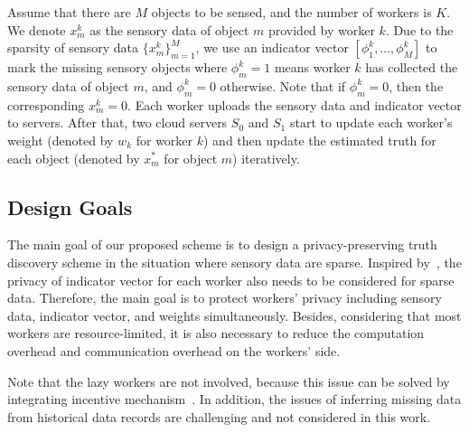 \documentclass[conference]{IEEEtran}
\begin{document}
Assume that there are $M$ objects to be sensed, and the number of workers is $K$.
We denote $x_m^k$ as the sensory data of object $m$ provided by worker $k$.
Due to the sparsity of sensory data $\{x_m^k\}_{m=1}^M$, we use an indicator vector $[\phi_1^k, \ldots, \phi_M^k]$ to mark the missing sensory objects where $\phi_m^k = 1$ means worker $k$ has collected the sensory data of object $m$, and $\phi_m^k = 0$ otherwise.
Note that if $\phi_m^k = 0$, then the corresponding $x_m^k = 0$.
Each worker uploads the sensory data and indicator vector to servers.
After that, two cloud servers $S_0$ and $S_1$ start to update each worker's weight (denoted by $w_k$ for worker $k$) and then update the estimated truth for each object (denoted by $x_m^*$ for object $m$) iteratively. 

\subsection{Design Goals}
The main goal of our proposed scheme is to design a privacy-preserving truth discovery scheme in the situation where sensory data are sparse.
Inspired by~\cite{wang_sparse_2020}, the privacy of indicator vector for each worker also needs to be considered for sparse data.
Therefore, the main goal is to protect workers' privacy including sensory data, indicator vector, and weights simultaneously.
Besides, considering that most workers are resource-limited, it is also necessary to reduce the computation overhead and communication overhead on the workers' side.

Note that the lazy workers are not involved, because this issue can be solved by integrating incentive mechanism~\cite{xue_inpptd_2020}.
In addition, the issues of inferring missing data from historical data records are challenging and not considered in this work.
\end{document}
